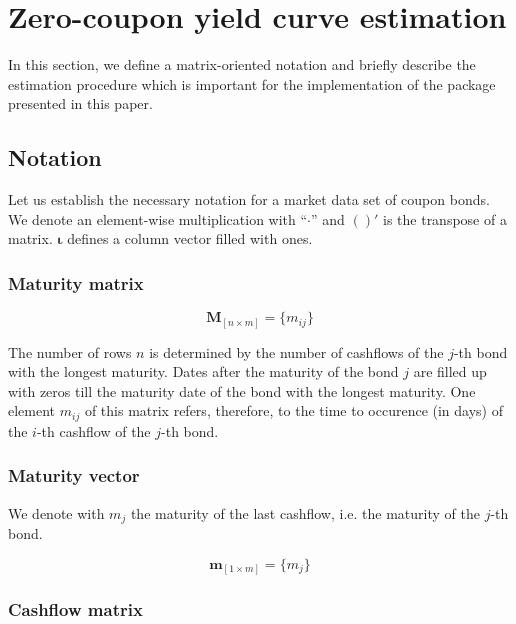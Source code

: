 \section{Zero-coupon yield curve estimation}
\label{sec:zcy-estim}

In this section, we define a matrix-oriented notation and briefly describe the estimation procedure which is important for the implementation of the  package presented in this paper.

\subsection{Notation}
\label{sec:notation}

Let us establish the necessary notation for a market data set of coupon bonds. We denote an element-wise multiplication with ``$\cdot$'' and $( )'$ is the transpose of a matrix. $\bm{\iota}$ defines a column vector filled with ones.

\subsubsection*{Maturity matrix}

\begin{equation*}\label{maturitym}
\bm{M}_{\left[n\times m\right]}= \{m_{ij}\}
\end{equation*}

The number of rows $n$ is determined by the number of cashflows of the $j$-th bond with the longest maturity. Dates after the maturity of the bond $j$ are filled up with zeros till the maturity date of the bond with the longest maturity. One element $m_{ij}$ of this matrix refers, therefore, to the time to occurence (in days) of the $i$-th cashflow of the $j$-th bond. 

\subsubsection*{Maturity vector}

We denote with $m_j$ the maturity of the last cashflow, i.e. the maturity of the $j$-th bond.

\begin{equation*}\label{weights}
    \bm{m}_{\left[1\times m\right]}= \{m_j\}
\end{equation*}

\subsubsection*{Cashflow matrix}


